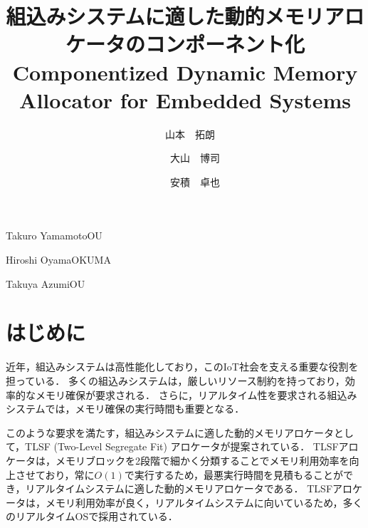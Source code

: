 \documentclass[submit,techrep]{ipsj_v2/UTF8/ipsj}
\begin{document}
\title{
    {\Huge 組込みシステムに適した動的メモリアロケータのコンポーネント化}
  \\{\huge Componentized Dynamic Memory Allocator for Embedded Systems}
}

\etitle{\vspace{-3.5cm}}



\author{　{\LARGE 山本　拓朗}}{{\Large Takuro Yamamoto}}{OU}%
\author{　　{\LARGE 大山　博司}}{{\Large Hiroshi Oyama}}{OKUMA}%
\author{　　{\LARGE 安積　卓也}}{{\Large Takuya Azumi}}{OU}%

\maketitle

\thispagestyle{fancy}
\renewcommand{\headrulewidth}{0pt} %
\chead[]{}
\cfoot[]{}

\section{はじめに}

近年，組込みシステムは高性能化しており，このIoT社会を支える重要な役割を担っている\cite{par:IoTIndustries}\cite{par:IoTComputing}．
多くの組込みシステムは，厳しいリソース制約を持っており，効率的なメモリ確保が要求される．
さらに，リアルタイム性を要求される組込みシステムでは，メモリ確保の実行時間も重要となる．

このような要求を満たす，組込みシステムに適した動的メモリアロケータとして，TLSF (Two-Level Segregate Fit) アロケータが提案されている\cite{par:TLSF}\cite{url:TLSF}．
TLSFアロケータは，メモリブロックを2段階で細かく分類することでメモリ利用効率を向上させており，常に$O(1)$で実行するため，最悪実行時間を見積もることができ，リアルタイムシステムに適した動的メモリアロケータである．
TLSFアロケータは，メモリ利用効率が良く，リアルタイムシステムに向いているため，多くのリアルタイムOSで採用されている．
\end{document}
